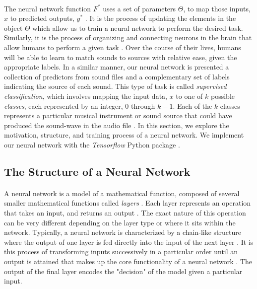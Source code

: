 \documentclass[12pt,letterpaper]{article}
\begin{document}
\paragraph*{}The neural network function $F^*$ uses a set of parameters $\Theta$, to map those inputs, $x$ to predicted outputs, $y^*$ \cite{Goodfellow,James,Virtanen}. It is the process of updating the elements in the object $\Theta$ which allow us to train a neural network to perform the desired task. Similarly, it is the process of organizing and connecting neurons in the brain that allow humans to perform a given task \cite{Geron,Levine}. Over the course of their lives, humans will be able to learn to match sounds to sources with relative ease, given the appropriate labels. In a similar manner, our neural network is presented a collection of predictors from sound files and a complementary set of labels indicating the source of each sound. This type of task is called \textit{supervised classification}, which involves mapping the input data, $x$ to one of $k$ possible \textit{classes}, each represented by an integer, $0$ through $k-1$. Each of the $k$ classes represents a particular musical instrument or sound source that could have produced the sound-wave in the audio file \cite{Goodfellow,Loy,Virtanen}. In this section, we explore the motivation, structure, and training process of a neural network. We implement our neural network with the \textit{Tensorflow} Python package \cite{Tensorflow}.


\subsection{The Structure of a Neural Network}
\label{subsec-NetworkStructure}

\paragraph*{}A neural network is a model of a mathematical function, composed of several smaller mathematical functions called \textit{layers} \cite{Goodfellow,Loy}. Each layer represents an operation that takes an input, and returns an output . The exact nature of this operation can be very different depending on the layer type or where it sits within the network. Typically, a neural network is characterized by a chain-like structure where the output of one layer is fed directly into the input of the next layer \cite{Geron,Goodfellow}. It is this process of transforming inputs successively in a particular order until an output is attained that makes up the core functionality of a neural network \cite{Geron,Loy}. The output of the final layer encodes the "decision" of the model given a particular input.
\end{document}
